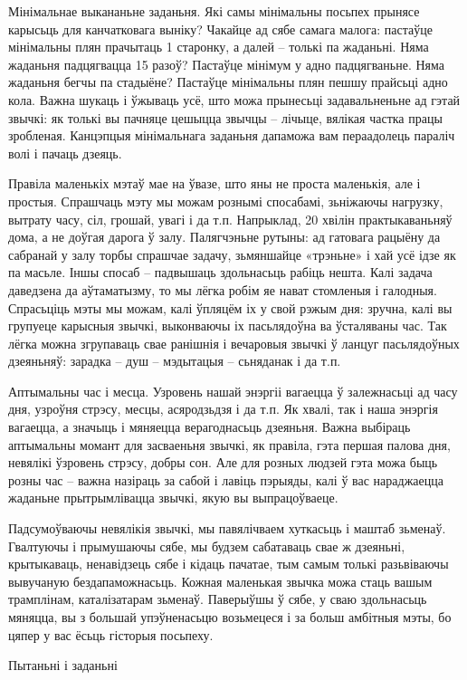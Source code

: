 Мінімальнае выкананьне заданьня. Які самы мінімальны посьпех прынясе карысьць для канчатковага выніку? Чакайце ад сябе самага малога: пастаўце мінімальны плян прачытаць 1 старонку, а далей – толькі па жаданьні. Няма жаданьня падцягвацца 15 разоў? Пастаўце мінімум у адно падцягваньне. Няма жаданьня бегчы па стадыёне? Пастаўце мінімальны плян пешшу прайсьці адно кола. Важна шукаць і ўжываць усё, што можа прынесьці задавальненьне ад гэтай звычкі: як толькі вы пачняце цешыцца звычцы – лічыце, вялікая частка працы зробленая. Канцэпцыя мінімальнага заданьня дапаможа вам пераадолець параліч волі і пачаць дзеяць.

Правіла маленькіх мэтаў мае на ўвазе, што яны не проста маленькія, але і простыя. Спрашчаць мэту мы можам рознымі спосабамі, зьніжаючы нагрузку, вытрату часу, сіл, грошай, увагі і да т.п. Напрыклад, 20 хвілін практыкаваньняў дома, а не доўгая дарога ў залу. Палягчэньне рутыны: ад гатовага рацыёну да сабранай у залу торбы спрашчае задачу, зьмяншайце «трэньне» і хай усё ідзе як па масьле. Іншы спосаб – падвышаць здольнасьць рабіць нешта. Калі задача даведзена да аўтаматызму, то мы лёгка робім яе нават стомленыя і галодныя. Спрасьціць мэты мы можам, калі ўпляцём іх у свой рэжым дня: зручна, калі вы групуеце карысныя звычкі, выконваючы іх пасьлядоўна ва ўсталяваны час. Так лёгка можна згрупаваць свае ранішнія і вечаровыя звычкі ў ланцуг пасьлядоўных дзеяньняў: зарадка – душ – мэдытацыя – сьняданак і да т.п.

Аптымальны час і месца. Узровень нашай энэргіі вагаецца ў залежнасьці ад часу дня, узроўня стрэсу, месцы, асяродзьдзя і да т.п. Як хвалі, так і наша энэргія вагаецца, а значыць і мяняецца верагоднасьць дзеяньня. Важна выбіраць аптымальны момант для засваеньня звычкі, як правіла, гэта першая палова дня, невялікі ўзровень стрэсу, добры сон. Але для розных людзей гэта можа быць розны час – важна назіраць за сабой і лавіць пэрыяды, калі ў вас нараджаецца жаданьне прытрымлівацца звычкі, якую вы выпрацоўваеце.

Падсумоўваючы невялікія звычкі, мы павялічваем хуткасьць і маштаб зьменаў. Гвалтуючы і прымушаючы сябе, мы будзем сабатаваць свае ж дзеяньні, крытыкаваць, ненавідзець сябе і кідаць пачатае, тым самым толькі разьвіваючы вывучаную бездапаможнасьць. Кожная маленькая звычка можа стаць вашым трамплінам, каталізатарам зьменаў. Паверыўшы ў сябе, у сваю здольнасьць мяняцца, вы з большай упэўненасьцю возьмецеся і за больш амбітныя мэты, бо цяпер у вас ёсьць гісторыя посьпеху.

Пытаньні і заданьні

